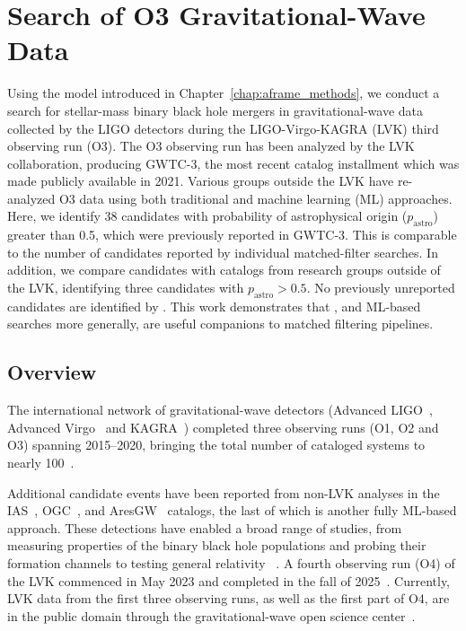 
\chapter{\aframe Search of O3 Gravitational-Wave Data}
\label{chap:o3_catalog}

\begin{refsection}

Using the \aframe model introduced in Chapter~\ref{chap:aframe_methods}, we conduct a search for stellar-mass binary black hole mergers in gravitational-wave data collected by the LIGO detectors during the LIGO-Virgo-KAGRA (LVK) third observing run (O3).
The O3 observing run has been analyzed by the LVK collaboration, producing GWTC-3, the most recent catalog installment which was made publicly available in 2021. 
Various groups outside the LVK have re-analyzed O3 data using both traditional and machine learning (ML) approaches. 
Here, we identify 38 candidates with probability of astrophysical origin ($p_\mathrm{astro}$) greater than 0.5, which were previously reported in GWTC-3. 
This is comparable to the number of candidates reported by individual matched-filter searches. 
In addition, we compare \aframe candidates with catalogs from research groups outside of the LVK, identifying three candidates with $p_\mathrm{astro} > 0.5$. 
No previously unreported candidates are identified by \aframe. 
This work demonstrates that \aframe, and ML-based searches more generally, are useful companions to matched filtering pipelines.


\section{Overview}

\begin{sloppypar}
The international network of gravitational-wave detectors (Advanced LIGO~\cite{Aasi_2015}, Advanced Virgo~\cite{Acernese_2015} and KAGRA~\cite{kagra}) completed three observing runs (O1, O2 and O3) spanning 2015--2020, bringing the total number of cataloged systems to nearly 100~\cite{Abbott_2023}.
\end{sloppypar}
Additional candidate events have been reported from non-LVK analyses in the IAS~\cite{ias_o3a, ias_o3b}, OGC~\cite{3-ogc, 4-ogc}, and AresGW~\cite{ares_gw_o3} catalogs, the last of which is another fully ML-based approach.
These detections have enabled a broad range of studies, from measuring properties of the binary black hole populations and probing their formation channels to testing general relativity ~\cite{testing-gr, gwtc-3-astro}.
A fourth observing run (O4) of the LVK commenced in May 2023 and completed in the fall of 2025~\cite{o4_plans}.
Currently, LVK data from the first three observing runs, as well as the first part of O4, are in the public domain through the gravitational-wave open science center~\cite{Abbott_2023_open_data}.


\end{refsection}
